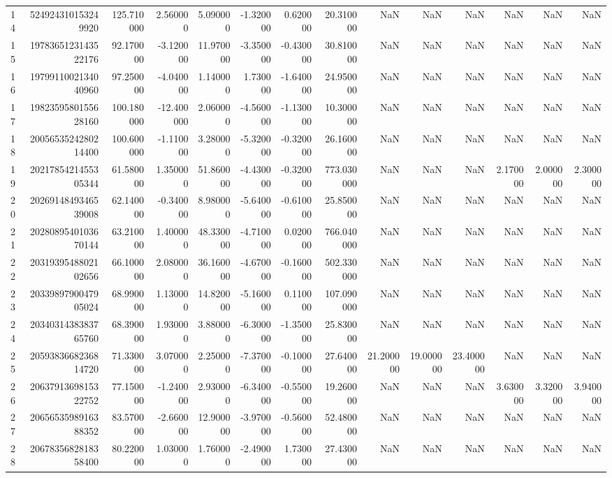 \begin{tabular}{lrrrrrrrrrrrrr}
14 & 524924310153249920 & 125.710000 & 2.560000 & 5.090000 & -1.320000 & 0.620000 & 20.310000 & NaN & NaN & NaN & NaN & NaN & NaN \\
15 & 1978365123143522176 & 92.170000 & -3.120000 & 11.970000 & -3.350000 & -0.430000 & 30.810000 & NaN & NaN & NaN & NaN & NaN & NaN \\
16 & 1979911002134040960 & 97.250000 & -4.040000 & 1.140000 & 1.730000 & -1.640000 & 24.950000 & NaN & NaN & NaN & NaN & NaN & NaN \\
17 & 1982359580155628160 & 100.180000 & -12.400000 & 2.060000 & -4.560000 & -1.130000 & 10.300000 & NaN & NaN & NaN & NaN & NaN & NaN \\
18 & 2005653524280214400 & 100.600000 & -1.110000 & 3.280000 & -5.320000 & -0.320000 & 26.160000 & NaN & NaN & NaN & NaN & NaN & NaN \\
19 & 2021785421455305344 & 61.580000 & 1.350000 & 51.860000 & -4.430000 & -0.320000 & 773.030000 & NaN & NaN & NaN & 2.170000 & 2.000000 & 2.300000 \\
20 & 2026914849346539008 & 62.140000 & -0.340000 & 8.980000 & -5.640000 & -0.610000 & 25.850000 & NaN & NaN & NaN & NaN & NaN & NaN \\
21 & 2028089540103670144 & 63.210000 & 1.400000 & 48.330000 & -4.710000 & 0.020000 & 766.040000 & NaN & NaN & NaN & NaN & NaN & NaN \\
22 & 2031939548802102656 & 66.100000 & 2.080000 & 36.160000 & -4.670000 & -0.160000 & 502.330000 & NaN & NaN & NaN & NaN & NaN & NaN \\
23 & 2033989790047905024 & 68.990000 & 1.130000 & 14.820000 & -5.160000 & 0.110000 & 107.090000 & NaN & NaN & NaN & NaN & NaN & NaN \\
24 & 2034031438383765760 & 68.390000 & 1.930000 & 3.880000 & -6.300000 & -1.350000 & 25.830000 & NaN & NaN & NaN & NaN & NaN & NaN \\
25 & 2059383668236814720 & 71.330000 & 3.070000 & 2.250000 & -7.370000 & -0.100000 & 27.640000 & 21.200000 & 19.000000 & 23.400000 & NaN & NaN & NaN \\
26 & 2063791369815322752 & 77.150000 & -1.240000 & 2.930000 & -6.340000 & -0.550000 & 19.260000 & NaN & NaN & NaN & 3.630000 & 3.320000 & 3.940000 \\
27 & 2065653598916388352 & 83.570000 & -2.660000 & 12.900000 & -3.970000 & -0.560000 & 52.480000 & NaN & NaN & NaN & NaN & NaN & NaN \\
28 & 2067835682818358400 & 80.220000 & 1.030000 & 1.760000 & -2.490000 & 1.730000 & 27.430000 & NaN & NaN & NaN & NaN & NaN & NaN \\

\end{tabular}
